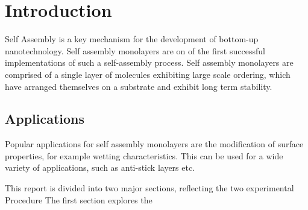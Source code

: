 \section{Introduction}


Self Assembly is a key mechanism for the development of bottom-up nanotechnology. Self assembly monolayers are on of the first successful implementations of such a self-assembly process. Self assembly monolayers are comprised of a single layer of molecules exhibiting large scale ordering, which have arranged themselves on a substrate and exhibit long term stability.

\subsection{Applications}

Popular applications for self assembly monolayers are the modification of surface properties, for example wetting characteristics. This can be used for a wide variety of applications, such as anti-stick layers etc.

This report is divided into two major sections, reflecting the two experimental Procedure The first section explores the